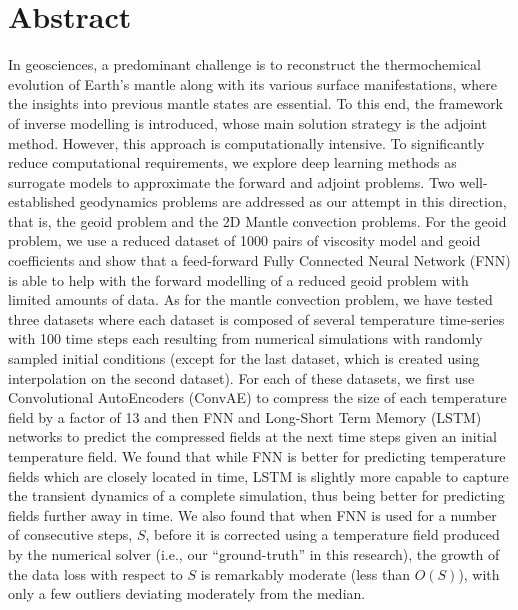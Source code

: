 \chapter*{Abstract}
In geosciences, a predominant challenge is to reconstruct the thermochemical evolution of Earth's mantle along with its various surface manifestations, where the insights into previous mantle states are essential. To this end, 
the framework of inverse modelling is introduced, whose main solution strategy is the adjoint method. However, this approach is computationally intensive. To significantly reduce computational requirements, we explore deep learning methods as surrogate models to approximate the forward and adjoint problems. Two well-established geodynamics problems are addressed as our attempt in this direction, that is, the geoid problem and the 2D Mantle convection problems. For the geoid problem, we use a reduced dataset of 1000 pairs of viscosity model and geoid coefficients and show that a feed-forward Fully Connected Neural Network (FNN) is able to help with the forward modelling of a reduced geoid problem with limited amounts of data. As for the mantle convection problem, we have tested three datasets where each dataset is composed of several temperature time-series with 100 time steps each resulting from numerical simulations with randomly sampled initial conditions (except for the last dataset, which is created using interpolation on the second dataset). For each of these datasets, we first use Convolutional AutoEncoders (ConvAE) to compress the size of each temperature field by a factor of 13 and then FNN and Long-Short Term Memory (LSTM) networks to predict the compressed fields at the next time steps given an initial temperature field. We found that while FNN is better for predicting temperature fields which are closely located in time, LSTM is slightly more capable to capture the transient dynamics of a complete simulation, thus being better for predicting fields further away in time. We also found that when FNN is used for a number of consecutive steps, $S$, before it is corrected using a temperature field produced by the numerical solver (i.e., our ``ground-truth'' in this research), the growth of the data loss with respect to $S$ is remarkably moderate (less than $O(S)$), with only a few outliers deviating moderately from the median.